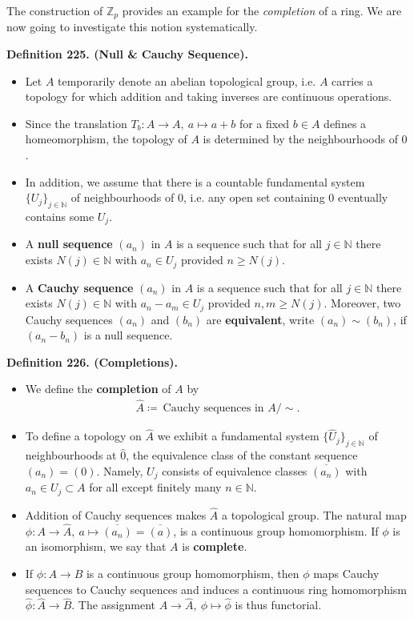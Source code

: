 \documentclass[12pt,a4paper,footinclude=true,headinclude=true]{scrbook} %
\newenvironment{definition}[2][Definition]
    { \begin{mdframed}[backgroundcolor=gray!20] \textbf{#1 #2.}\ }
    {  \end{mdframed}}
\begin{document}
The construction of $\mathbb{Z}_p$ provides an example for the \textit{completion} of a ring. We are now going to investigate this notion systematically.
\begin{definition}{225. (Null \& Cauchy Sequence)}
    \begin{itemize}
        \item Let $A$ temporarily denote an abelian topological group, i.e. $A$ carries a topology for which addition and taking inverses are continuous operations.
        \item Since the translation $T_b:A\to A,\ a\mapsto a+b$ for a fixed $b\in A$ defines a homeomorphism, the topology of $A$ is determined by the neighbourhoods of $0$. 
        \item In addition, we assume that there is a countable fundamental system $\{U_j\}_{j\in\mathbb{N}}$ of neighbourhoods of $0$, i.e. any open set containing $0$ eventually contains some $U_j$.
        \item A \textbf{null sequence} $(a_n)$ in $A$ is a sequence such that for all $j\in\mathbb{N}$ there exists $N(j)\in\mathbb{N}$ with $a_n\in U_j$ provided $n\geq N(j)$. 
        \item A \textbf{Cauchy sequence} $(a_n)$ in $A$ is a sequence such that for all $j\in\mathbb{N}$ there exists $N(j)\in\mathbb{N}$ with $a_n-a_m\in U_j$ provided $n,m\geq N(j)$. Moreover, two Cauchy sequences $(a_n)$ and $(b_n)$ are \textbf{equivalent}, write $(a_n)\sim(b_n)$, if $(a_n-b_n)$ is a null sequence.
    \end{itemize}
\end{definition}
\newpage
\begin{definition}{226. (Completions)}
    \begin{itemize}
        \item We define the \textbf{completion} of $A$ by 
        \begin{align*}
            \widehat{A}\coloneqq\ \text{Cauchy sequences in $A$}/\sim.
        \end{align*}
        \item To define a topology on $\widehat{A}$ we exhibit a fundamental system $\{\widehat{U}_j\}_{j\in\mathbb{N}}$ of neighbourhoods at $\widehat{0}$, the equivalence class of the constant sequence $(a_n)=(0)$. Namely, $U_j$ consists of equivalence classes $\overline{(a_n)}$ with $a_n\in U_j\subset A$ for all except finitely many $n\in\mathbb{N}$.
        \item Addition of Cauchy sequences makes $\widehat{A}$ a topological group. The natural map $\phi:A\to\widehat{A},\ a\mapsto\overline{(a_n)}=\overline{(a)}$, is a continuous group homomorphism. If $\phi$ is an isomorphism, we say that $A$ is \textbf{complete}.
        \item If $\phi:A\to B$ is a continuous group homomorphism, then $\phi$ maps Cauchy sequences to Cauchy sequences and induces a continuous ring homomorphism $\widehat{\phi}:\widehat{A}\to\widehat{B}$. The assignment $A\to\widehat{A},\ \phi\mapsto\widehat{\phi}$ is thus functorial.
    \end{itemize}
\end{definition}
\end{document}
